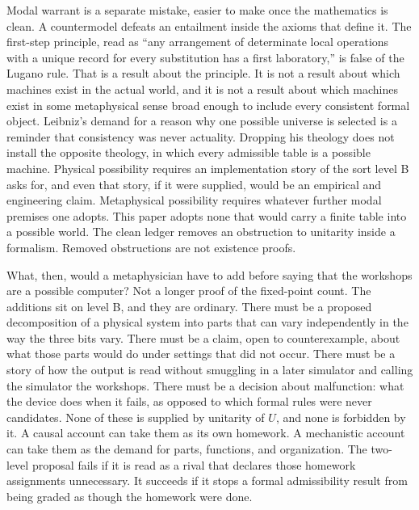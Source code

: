 \documentclass[11pt]{article}
\begin{document}
Modal warrant is a separate mistake, easier to make once the mathematics is clean. A countermodel defeats an entailment inside the axioms that define it. The first-step principle, read as ``any arrangement of determinate local operations with a unique record for every substitution has a first laboratory,'' is false of the Lugano rule. That is a result about the principle. It is not a result about which machines exist in the actual world, and it is not a result about which machines exist in some metaphysical sense broad enough to include every consistent formal object. Leibniz’s demand for a reason why one possible universe is selected is a reminder that consistency was never actuality. Dropping his theology does not install the opposite theology, in which every admissible table is a possible machine. Physical possibility requires an implementation story of the sort level B asks for, and even that story, if it were supplied, would be an empirical and engineering claim. Metaphysical possibility requires whatever further modal premises one adopts. This paper adopts none that would carry a finite table into a possible world. The clean ledger removes an obstruction to unitarity inside a formalism. Removed obstructions are not existence proofs.

What, then, would a metaphysician have to add before saying that the workshops are a possible computer? Not a longer proof of the fixed-point count. The additions sit on level B, and they are ordinary. There must be a proposed decomposition of a physical system into parts that can vary independently in the way the three bits vary. There must be a claim, open to counterexample, about what those parts would do under settings that did not occur. There must be a story of how the output is read without smuggling in a later simulator and calling the simulator the workshops. There must be a decision about malfunction: what the device does when it fails, as opposed to which formal rules were never candidates. None of these is supplied by unitarity of \(U\), and none is forbidden by it. A causal account can take them as its own homework. A mechanistic account can take them as the demand for parts, functions, and organization. The two-level proposal fails if it is read as a rival that declares those homework assignments unnecessary. It succeeds if it stops a formal admissibility result from being graded as though the homework were done.
\end{document}
